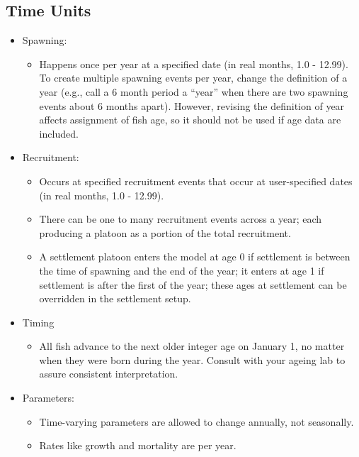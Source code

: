 \hypertarget{RecrTiming}{}
\subsection{Time Units}
	\begin{itemize}
		\item Spawning: 
		\begin{itemize}
			\item Happens once per year at a specified date (in real months, 1.0 - 12.99). To create multiple spawning events per year, change the definition of a year (e.g., call a 6 month period a ``year'' when there are two spawning events about 6 months apart). However, revising the definition of year affects assignment of fish age, so it should not be used if age data are included.
		\end{itemize}
		
		\item Recruitment: 
		\begin{itemize}
			\item Occurs at specified recruitment events that occur at user-specified dates (in real months, 1.0 - 12.99).
			\item There can be one to many recruitment events across a year; each producing a platoon as a portion of the total recruitment.
			\item A settlement platoon enters the model at age 0 if settlement is between the time of spawning and the end of the year; it enters at age 1 if settlement is after the first of the year; these ages at settlement can be overridden in the settlement setup.
		\end{itemize}
		
		\item Timing
		\begin{itemize}
			\item All fish advance to the next older integer age on January 1, no matter when they were born during the year.  Consult with your ageing lab to assure consistent interpretation.
		\end{itemize}		

		\item Parameters:
		\begin{itemize}
			\item Time-varying parameters are allowed to change annually, not seasonally.
			\item Rates like growth and mortality are per year.
		\end{itemize}
	\end{itemize}
	
